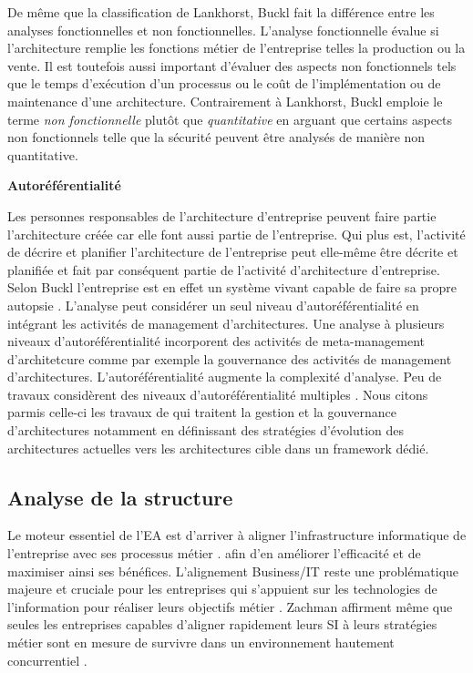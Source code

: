 \begin{description}
De même que la classification de Lankhorst, Buckl fait la différence entre les analyses fonctionnelles et non fonctionnelles. L'analyse fonctionnelle évalue si l'architecture remplie les fonctions métier de l'entreprise telles la production ou la vente. Il est toutefois aussi important d'évaluer des aspects non fonctionnels tels que le temps d'exécution d'un processus ou le coût de l'implémentation ou de maintenance d'une architecture. Contrairement à Lankhorst, Buckl emploie le terme \textit{non fonctionnelle} plutôt que \textit{quantitative} en arguant que certains aspects non fonctionnels telle que la sécurité peuvent être analysés de manière non quantitative.  

	\item \textbf{Autoréférentialité}
	
Les personnes responsables de l'architecture d'entreprise peuvent faire partie l'architecture créée car elle font aussi partie de l'entreprise. Qui plus est, l'activité de décrire et planifier l'architecture de l'entreprise peut elle-même être décrite et planifiée et fait par conséquent partie de l'activité d'architecture d'entreprise. Selon Buckl \cite{varela1974autopoiesis} l'entreprise est en effet un système vivant capable de faire sa propre autopsie \cite{varela1974autopoiesis}.
L'analyse peut considérer un seul niveau d'autoréférentialité en intégrant les activités de management d'architectures. Une analyse à plusieurs niveaux d'autoréférentialité incorporent des activités de meta-management d'architetcure comme par exemple la gouvernance des activités de management d'architectures.
L'autoréférentialité augmente la complexité d'analyse. Peu de travaux considèrent des niveaux d'autoréférentialité  multiples \cite{smook2014executable}. Nous citons parmis celle-ci les travaux de \cite{metrailler_evolis_2014} qui traitent la gestion et la gouvernance d'architectures notamment en définissant des stratégies d'évolution des architectures actuelles vers les architectures cible dans un framework dédié. 

\end{description}

	\subsection{Analyse de la structure}
	Le moteur essentiel de l'EA est d'arriver à aligner l'infrastructure informatique de l'entreprise avec ses processus métier \cite{lankhorst2013enterprise}. afin d'en améliorer l'efficacité et de maximiser ainsi ses bénéfices. L'alignement Business/IT reste une problématique majeure et cruciale pour les entreprises qui s'appuient sur les technologies de l'information pour réaliser leurs objectifs métier \cite{kaisler_enterprise_2005}. Zachman affirment même que seules les entreprises capables d'aligner rapidement leurs SI à leurs stratégies métier sont en mesure de survivre dans un environnement hautement concurrentiel \cite{zachman1997enterprise}.
	
